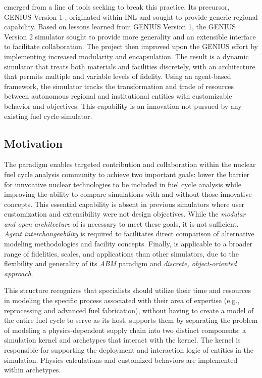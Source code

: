 \Cyclus emerged from a line of tools seeking to break this practice.  Its
precursor, \gls{GENIUS} Version 1
\cite{dunzik-gougar_global_2007,jain_transitioning_2006}, originated within
\gls{INL} and sought to provide generic regional capability.  Based on lessons
learned from \gls{GENIUS} Version 1, the \gls{GENIUS} Version 2
\cite{oliver_studying_2009,huff_geniusv2_2009} simulator sought to provide more
generality and an extensible interface to facilitate collaboration.  The \Cyclus
project then improved upon the \gls{GENIUS} effort by implementing increased
modularity and encapsulation.  The result is a dynamic simulator that treats
both materials and facilities discretely, with an architecture that permits
multiple and variable levels of fidelity. Using an agent-based framework, the
simulator tracks the transformation and trade of resources between autonomous
regional and institutional entities with customizable behavior and
objectives. This capability is an innovation not pursued by any existing fuel
cycle simulator.


\subsection{Motivation}

The \Cyclus paradigm enables targeted contribution and collaboration within the
nuclear fuel cycle analysis community to achieve two important goals: lower the
barrier for innvoative nuclear technologies to be included in fuel cycle analysis 
while improving the ability to compare simulations with and without those innovative
concepts.  This essential capability is absent in
previous simulators where user customization and extensibility were not design
objectives.  While the \emph{modular and open architecture} of
\Cyclus is necessary to meet these goals, it is not sufficient.  
\emph{Agent interchangeability} is required to facilitates direct comparison 
of alternative modeling methodologies and facility concepts.  Finally, \Cyclus is
applicable to a broader range of fidelities, scales, and applications than
other simulators, due to the flexibility and generality of its
\emph{\gls{ABM}} paradigm and \emph{discrete, object-oriented approach}.

This structure recognizes that specialists should utilize their time and
resources in modeling the specific process associated with their area of
expertise (e.g., reprocessing and advanced fuel fabrication), without having to
create a model of the entire fuel cycle to serve as its host.  \Cyclus supports
them by separating the problem of modeling a physics-dependent supply chain into
two distinct components: a simulation kernel and archetypes that interact with
the kernel. The kernel is responsible for supporting the deployment and
interaction logic of entities in the simulation.  Physics calculations and
customized behaviors are implemented within archetypes.


